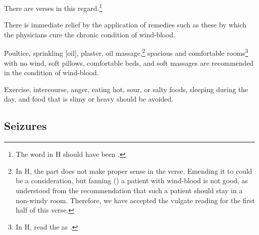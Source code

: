 \begin{translation}
\begin{tt}
There are verses in this regard.\footnote{The word  in H
    should have been .}

\begin{sloka}
There is immediate relief by the application of remedies such as these by
which the physicians cure the chronic condition of wind-blood.
\end{sloka}


\item[15--16]

\begin{sloka}
Poultice, sprinkling [oil], plaster, oil massage,\footnote{In H, the
    part  does not make proper sense in the verse.
    Emending it to  could be a consideration, but
    fanning () a patient with wind-blood is not good, as
    understood from the recommendation that such a patient should stay in
    a non-windy room. Therefore, we have accepted the vulgate reading for
    the first half of this verse.} spacious and comfortable
    rooms\footnote{In H, read the   as .}
        with no wind, soft pillows, comfortable beds, and soft massages are
        recommended in the condition of wind-blood.
\end{sloka}

\item[17]

\begin{sloka}
Exercise, intercourse, anger, eating hot, sour, or salty foods,
sleeping during the day, and food that is slimy or heavy should be
avoided.
\end{sloka}

\subsection{Seizures}

\item[18]


\end{tt}
\end{translation}
